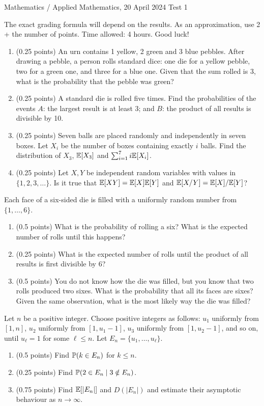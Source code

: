 \documentclass[a4paper]{report}
\begin{document}
\noindent Mathematics / Applied Mathematics, 20 April 2024 \hfill Test 1
\hrulefill
\begin{it}The exact grading formula will depend on the results. As an approximation, use 2 + the number of points. Time allowed: 4 hours. Good luck!\end{it}
\begin{problem}
\begin{enumerate}
\item (0.25 points) An urn contains 1 yellow, 2 green and 3 blue pebbles. After drawing a pebble, a person rolls standard dice: one die for a yellow pebble, two for a green one, and three for a blue one. Given that the sum rolled is 3, what is the probability that the pebble was green?
\item (0.25 points) A standard die is rolled five times. Find the probabilities of the events $A$: the largest result is at least 3; and $B$: the product of all results is divisible by 10.
\item (0.25 points) Seven balls are placed randomly and independently in seven boxes. Let $X_i$ be the number of boxes containing exactly $i$ balls. Find the distribution of $X_3$, $\E[X_3]$ and $\sum_{i=1}^7i\E[X_i]$.
\item (0.25 points) Let $X,Y$ be independent random variables with values in $\{1,2,3,\ldots\}$. Is it true that $\E[XY]=\E[X]\E[Y]$ and $\E[X/Y]=\E[X]/\E[Y]$?
\end{enumerate}
\end{problem}
\begin{problem}
Each face of a six-sided die is filled with a uniformly random number from $\{1,\ldots,6\}$.
\begin{enumerate}
\item (0.5 points) What is the probability of rolling a six? What is the expected number of rolls until this happens?
\item (0.25 points) What is the expected number of rolls until the product of all results is first divisible by 6?
\item (0.5 points) You do not know how the die was filled, but you know that two rolls produced two sixes. What is the probability that all its faces are sixes? Given the same observation, what is the most likely way the die was filled?
\end{enumerate}
\end{problem}
\begin{problem}
Let $n$ be a positive integer. Choose positive integers as follows: $u_1$ uniformly from $[1,n]$, $u_2$ uniformly from $[1,u_1-1]$, $u_3$ uniformly from $[1,u_2-1]$, and so on, until $u_\ell=1$ for some $\ell\leq n$. Let $E_n=\{u_1,\ldots,u_\ell\}$.
\begin{enumerate}
\item (0.5 points) Find $\P(k\in E_n)$ for $k\leq n$.
\item (0.25 points) Find $\P(2\in E_n\mid3\notin E_n)$.
\item (0.75 points) Find $\E[|E_n|]$ and $D(|E_n|)$ and estimate their asymptotic behaviour as $n\to\infty$.
\end{enumerate}
\end{problem}
\end{document}
